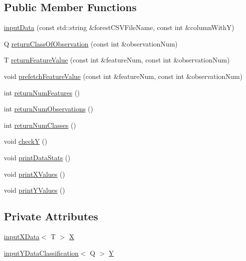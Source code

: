 \subsection*{Public Member Functions}
\begin{DoxyCompactItemize}
\item 
\hyperlink{classfp_1_1inputData_a1d1a4a8abfd9b4ef7f85cb48a0a017e4}{input\+Data} (const std\+::string \&forest\+C\+S\+V\+File\+Name, const int \&column\+WithY)
\item 
Q \hyperlink{classfp_1_1inputData_a0a767252e950159110d3f2a0c74064ec}{return\+Class\+Of\+Observation} (const int \&observation\+Num)
\item 
T \hyperlink{classfp_1_1inputData_af52ac3512ee8f6e973799e024ddbf629}{return\+Feature\+Value} (const int \&feature\+Num, const int \&observation\+Num)
\item 
void \hyperlink{classfp_1_1inputData_a348baff7c24d263bb24185dbaa19d455}{prefetch\+Feature\+Value} (const int \&feature\+Num, const int \&observation\+Num)
\item 
int \hyperlink{classfp_1_1inputData_ae9362286ea7706a8b0d91ba96e9ad478}{return\+Num\+Features} ()
\item 
int \hyperlink{classfp_1_1inputData_af7dc02941195e025d1d89c882096027d}{return\+Num\+Observations} ()
\item 
int \hyperlink{classfp_1_1inputData_a1e775e3744cb3bacb1a6776054aabe4f}{return\+Num\+Classes} ()
\item 
void \hyperlink{classfp_1_1inputData_a75ee69b1a4e16a5ceb54064c4f6f2d47}{checkY} ()
\item 
void \hyperlink{classfp_1_1inputData_a1311eef0523910e3b69ad828b55bf19b}{print\+Data\+Stats} ()
\item 
void \hyperlink{classfp_1_1inputData_aad488107f77249e42b75b66a4aea49f1}{print\+X\+Values} ()
\item 
void \hyperlink{classfp_1_1inputData_aa529afe056caade620ad93f9494980c6}{print\+Y\+Values} ()
\end{DoxyCompactItemize}
\subsection*{Private Attributes}
\begin{DoxyCompactItemize}
\item 
\hyperlink{classfp_1_1inputXData}{input\+X\+Data}$<$ T $>$ \hyperlink{classfp_1_1inputData_ad19581a60d2af60ebd3c8be5ac5ad95e}{X}
\item 
\hyperlink{classfp_1_1inputYDataClassification}{input\+Y\+Data\+Classification}$<$ Q $>$ \hyperlink{classfp_1_1inputData_a2ec8c0c7b9a8e114673c703edea4283d}{Y}
\end{DoxyCompactItemize}


